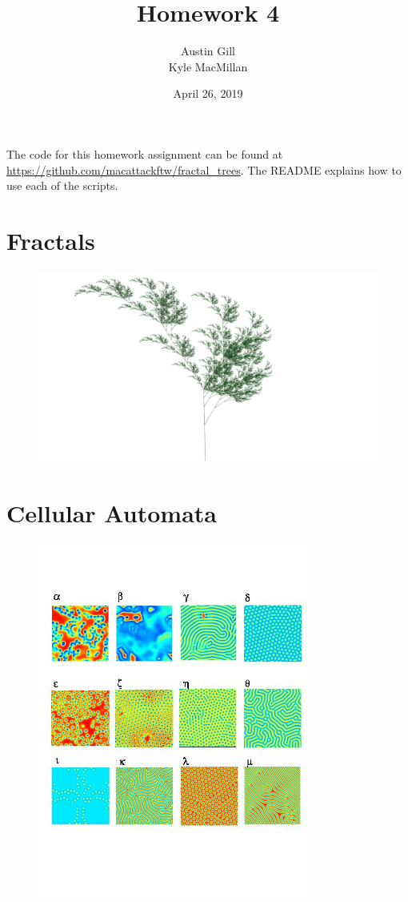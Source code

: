 \documentclass[12pt]{article}
\title{Homework 4}
\author{Austin Gill \\ Kyle MacMillan}
\date{April 26, 2019}
\begin{document}
\maketitle
\begingroup
\hypersetup{linkcolor=black}
\tableofcontents
\listoftodos
\endgroup

The code for this homework assignment can be found at \url{https://github.com/macattackftw/fractal_trees}.
The README explains how to use each of the scripts.

\newpage

\part{Fractals}
\vfill
\begin{figure}[H]
    \centering
    \includegraphics[width=\textwidth]{figures/L-systems/a.png}
\end{figure}




\part{Cellular Automata}
\begin{figure}[H]
    \centering
    \includegraphics[width=0.8\textwidth]{figures/reactions/patterns.jpg}
\end{figure}


\end{document}
